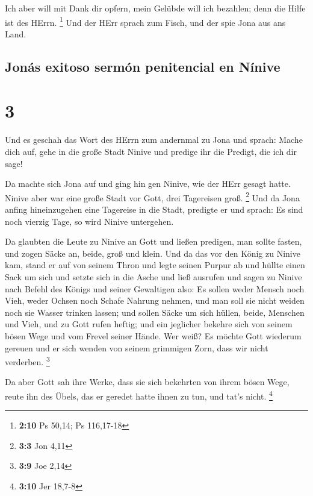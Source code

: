  Ich aber will mit Dank dir opfern, mein Gelübde will ich
bezahlen; denn die Hilfe ist des HErrn. \footnote{\textbf{2:10} Ps
  50,14; Ps 116,17-18}  Und der HErr sprach zum Fisch,
und der spie Jona aus ans Land.

\hypertarget{jonuxe1s-exitoso-sermuxf3n-penitencial-en-nuxednive}{%
\subsection{Jonás exitoso sermón penitencial en
Nínive}\label{jonuxe1s-exitoso-sermuxf3n-penitencial-en-nuxednive}}

\hypertarget{section-2}{%
\section{3}\label{section-2}}

 Und es geschah das Wort des HErrn zum andernmal zu Jona
und sprach:  Mache dich auf, gehe in die große Stadt
Ninive und predige ihr die Predigt, die ich dir sage!

 Da machte sich Jona auf und ging hin gen Ninive, wie der
HErr gesagt hatte. Ninive aber war eine große Stadt vor Gott, drei
Tagereisen groß. \footnote{\textbf{3:3} Jon 4,11}  Und da
Jona anfing hineinzugehen eine Tagereise in die Stadt, predigte er und
sprach: Es sind noch vierzig Tage, so wird Ninive untergehen.

 Da glaubten die Leute zu Ninive an Gott und ließen
predigen, man sollte fasten, und zogen Säcke an, beide, groß und klein.
 Und da das vor den König zu Ninive kam, stand er auf von
seinem Thron und legte seinen Purpur ab und hüllte einen Sack um sich
und setzte sich in die Asche  und ließ ausrufen und sagen
zu Ninive nach Befehl des Königs und seiner Gewaltigen also: Es sollen
weder Mensch noch Vieh, weder Ochsen noch Schafe Nahrung nehmen, und man
soll sie nicht weiden noch sie Wasser trinken lassen;  und
sollen Säcke um sich hüllen, beide, Menschen und Vieh, und zu Gott rufen
heftig; und ein jeglicher bekehre sich von seinem bösen Wege und vom
Frevel seiner Hände.  Wer weiß? Es möchte Gott wiederum
gereuen und er sich wenden von seinem grimmigen Zorn, dass wir nicht
verderben. \footnote{\textbf{3:9} Joe 2,14}

 Da aber Gott sah ihre Werke, dass sie sich bekehrten von
ihrem bösen Wege, reute ihn des Übels, das er geredet hatte ihnen zu
tun, und tat's nicht. \footnote{\textbf{3:10} Jer 18,7-8}

